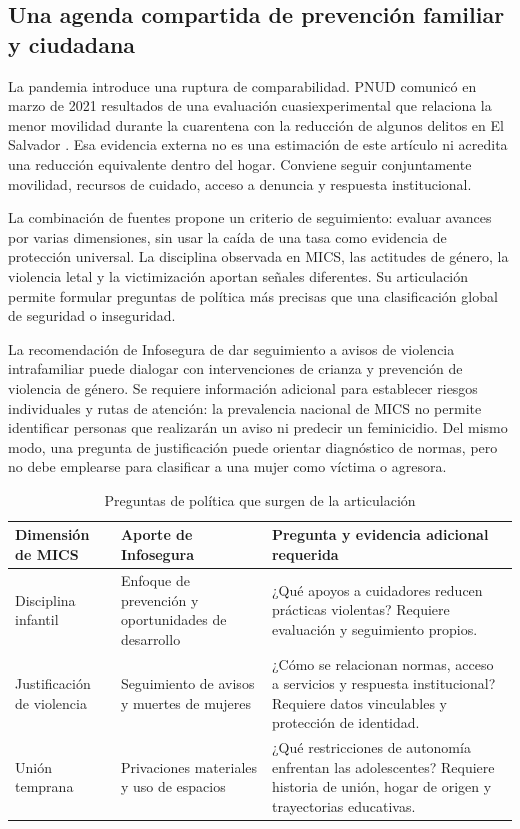 \subsection{Una agenda compartida de prevención familiar y ciudadana}
La pandemia introduce una ruptura de comparabilidad. PNUD comunicó en marzo
de 2021 resultados de una evaluación cuasiexperimental que relaciona la
menor movilidad durante la cuarentena con la reducción de algunos delitos
en El Salvador \citep{pnud2021marzo}. Esa evidencia externa no es una
estimación de este artículo ni acredita una reducción equivalente dentro
del hogar. Conviene seguir conjuntamente movilidad, recursos de cuidado,
acceso a denuncia y respuesta institucional.

La combinación de fuentes propone un criterio de seguimiento: evaluar
avances por varias dimensiones, sin usar la caída de una tasa como evidencia
de protección universal. La disciplina observada en MICS, las actitudes de
género, la violencia letal y la victimización aportan señales diferentes.
Su articulación permite formular preguntas de política más precisas que una
clasificación global de seguridad o inseguridad.

La recomendación de Infosegura de dar seguimiento a avisos de violencia
intrafamiliar puede dialogar con intervenciones de crianza y prevención de
violencia de género. Se requiere información adicional para establecer
riesgos individuales y rutas de atención: la prevalencia nacional de MICS no
permite identificar personas que realizarán un aviso ni predecir un feminicidio.
Del mismo modo, una pregunta de justificación puede orientar diagnóstico de
normas, pero no debe emplearse para clasificar a una mujer como víctima o agresora.

\begin{table}[htbp]
\centering\small
\caption{Preguntas de política que surgen de la articulación}\label{tab:agenda}
\begin{tabularx}{\textwidth}{@{}YYY@{}}\toprule
Dimensión de MICS & Aporte de Infosegura & Pregunta y evidencia adicional requerida\\\midrule
Disciplina infantil & Enfoque de prevención y oportunidades de desarrollo & ¿Qué apoyos a cuidadores reducen prácticas violentas? Requiere evaluación y seguimiento propios.\\
Justificación de violencia & Seguimiento de avisos y muertes de mujeres & ¿Cómo se relacionan normas, acceso a servicios y respuesta institucional? Requiere datos vinculables y protección de identidad.\\
Unión temprana & Privaciones materiales y uso de espacios & ¿Qué restricciones de autonomía enfrentan las adolescentes? Requiere historia de unión, hogar de origen y trayectorias educativas.\\\bottomrule
\end{tabularx}
\end{table}

